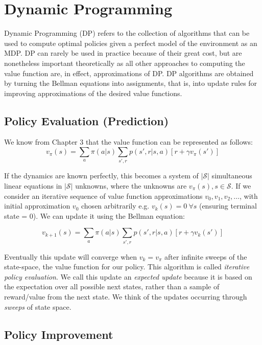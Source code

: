 \section{Dynamic Programming}
Dynamic Programming (DP) refers to the collection of algorithms that can be used to compute optimal policies given a perfect model of the environment as an MDP. DP can rarely be used in practice because of their great cost, but are nonetheless important theoretically as all other approaches to computing the value function are, in effect, approximations of DP. DP algorithms are obtained by turning the Bellman equations into assignments, that is, into update rules for improving approximations of the desired value functions.

\subsection{Policy Evaluation (Prediction)}
We know from Chapter 3 that the value function can be represented as follows:
\begin{equation}
v_\pi(s) = \sum_{a} \pi(a|s) \sum_{s',r} p(s', r | s, a) \left[r + \gamma v_\pi(s')\right]
\end{equation}

If the dynamics are known perfectly, this becomes a system of $|\mathcal{S}|$ simultaneous linear equations in $|\mathcal{S}|$ unknowns, where the unknowns are $v_\pi(s), s \in \mathcal{S}$. If we consider an iterative sequence of value function approximations $v_0, v_1, v_2, \ldots$, with initial approximation $v_0$ chosen arbitrarily e.g. $v_k(s) = 0 \:  \forall s$ (ensuring terminal state = 0). We can update it using the Bellman equation:

\begin{equation}
v_{k+1}(s) = \sum_{a} \pi(a|s) \sum_{s',r} p(s', r | s, a) \left[r + \gamma v_k(s')\right]
\end{equation}

Eventually this update will converge when $v_k = v_\pi$ after infinite sweeps of the state-space, the value function for our policy. This algorithm is called \textit{iterative policy evaluation}. We call this update an \textit{expected update} because it is based on the expectation over all possible next states, rather than a sample of reward/value from the next state. We think of the updates occurring through \textit{sweeps} of state space.

\subsection{Policy Improvement}

